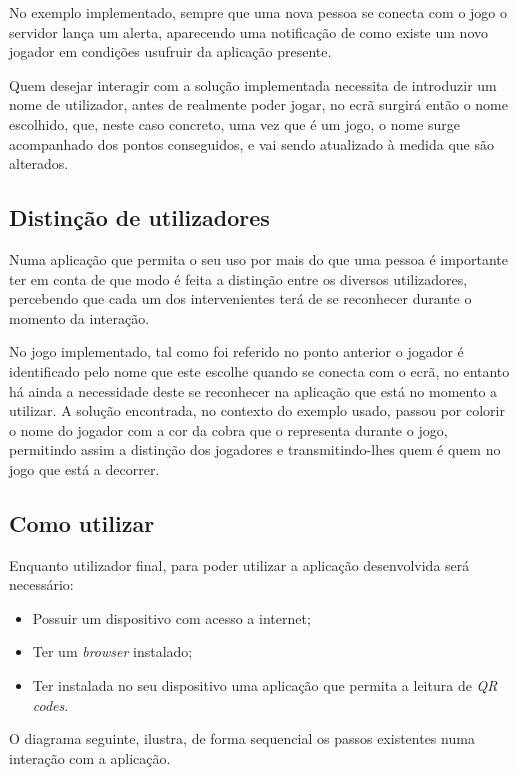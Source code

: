 	No exemplo implementado, sempre que uma nova pessoa se conecta com o jogo o servidor lança um alerta, aparecendo uma notificação de como existe um novo jogador em condições usufruir da aplicação presente. 

	Quem desejar interagir com a solução implementada necessita de introduzir um nome de utilizador, antes de realmente poder jogar, no ecrã surgirá então o nome escolhido, que, neste caso concreto, uma vez que é um jogo, o nome surge acompanhado dos pontos conseguidos, e vai sendo atualizado à medida que são alterados.

	\subsection{Distinção de utilizadores}

	Numa aplicação que permita o seu uso por mais do que uma pessoa é importante ter em conta de que modo é feita a distinção entre os diversos utilizadores, percebendo que cada um dos intervenientes terá de se reconhecer durante o momento da interação. 

	No jogo implementado, tal como foi referido no ponto anterior o jogador é identificado pelo nome que este escolhe quando se conecta com o ecrã, no entanto há ainda a necessidade deste se reconhecer na aplicação que está no momento a utilizar. A solução encontrada, no contexto do exemplo usado, passou por colorir o nome do jogador com a cor da cobra que o representa durante o jogo, permitindo assim a distinção dos jogadores e transmitindo-lhes quem é quem no jogo que está a decorrer.

	\subsection{Como utilizar}

	Enquanto utilizador final, para poder utilizar a aplicação desenvolvida será necessário:
	\begin{itemize}
		\item Possuir um dispositivo com acesso a internet;
		\item Ter um \textit{browser} instalado;
		\item Ter instalada no seu dispositivo uma aplicação que permita a leitura de \textit{QR codes}.
	\end{itemize}

	O diagrama seguinte, ilustra, de forma sequencial os passos existentes numa interação com a aplicação.
	\newline


